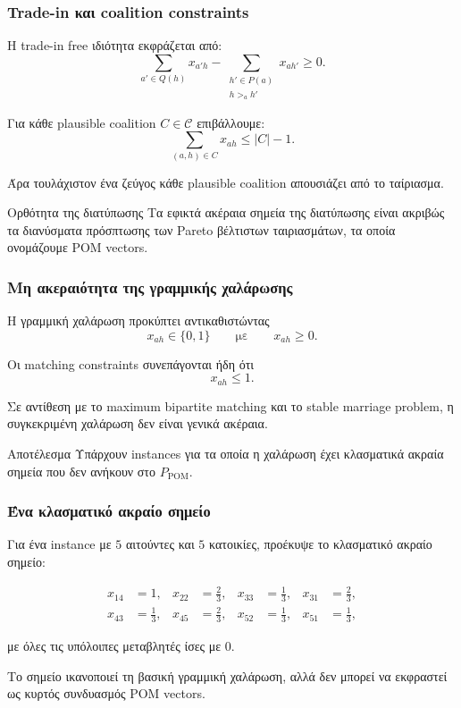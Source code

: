 \documentclass{beamer}
\begin{document}
	\begin{frame}
		\frametitle{Trade-in και coalition constraints}
		
		Η trade-in free ιδιότητα εκφράζεται από:
		\[
		\sum_{a'\in Q(h)}x_{a'h}
		-
		\sum_{\substack{h'\in P(a)\\h>_a h'}}x_{ah'}
		\geq 0.
		\]
		
		Για κάθε plausible coalition $C\in\mathcal C$ επιβάλλουμε:
		\[
		\sum_{(a,h)\in C}x_{ah}\leq |C|-1.
		\]
		
		Άρα τουλάχιστον ένα ζεύγος κάθε plausible coalition απουσιάζει από το ταίριασμα.
		
		\begin{block}{Ορθότητα της διατύπωσης}
			Τα εφικτά ακέραια σημεία της διατύπωσης είναι ακριβώς τα διανύσματα πρόσπτωσης των Pareto βέλτιστων ταιριασμάτων, τα οποία ονομάζουμε POM vectors.
		\end{block}
	\end{frame}
	
	\begin{frame}
		\frametitle{Μη ακεραιότητα της γραμμικής χαλάρωσης}
		
		Η γραμμική χαλάρωση προκύπτει αντικαθιστώντας
		\[
		x_{ah}\in\{0,1\}
		\qquad\text{με}\qquad
		x_{ah}\geq 0.
		\]
		
		Οι matching constraints συνεπάγονται ήδη ότι
		\[
		x_{ah}\leq 1.
		\]
		
		\vspace{0.3cm}
		
		Σε αντίθεση με το maximum bipartite matching και το stable marriage problem, η συγκεκριμένη χαλάρωση δεν είναι γενικά ακέραια.
		
		\begin{block}{Αποτέλεσμα}
			Υπάρχουν instances για τα οποία η χαλάρωση έχει κλασματικά ακραία σημεία που δεν ανήκουν στο $P_{\mathrm{POM}}$.
		\end{block}
	\end{frame}
	
	\begin{frame}
		\frametitle{Ένα κλασματικό ακραίο σημείο}
		
		Για ένα instance με $5$ αιτούντες και $5$ κατοικίες, προέκυψε το κλασματικό ακραίο σημείο:
		
		\small
		\[
		\begin{aligned}
			x_{14}&=1, &
			x_{22}&=\frac{2}{3}, &
			x_{33}&=\frac{1}{3}, &
			x_{31}&=\frac{2}{3},\\
			x_{43}&=\frac{1}{3}, &
			x_{45}&=\frac{2}{3}, &
			x_{52}&=\frac{1}{3}, &
			x_{51}&=\frac{1}{3},
		\end{aligned}
		\]
		\normalsize
		
		με όλες τις υπόλοιπες μεταβλητές ίσες με $0$.
		
		\vspace{0.3cm}
		
		Το σημείο ικανοποιεί τη βασική γραμμική χαλάρωση, αλλά δεν μπορεί να εκφραστεί ως κυρτός συνδυασμός POM vectors.
	\end{frame}
	
\end{document}
